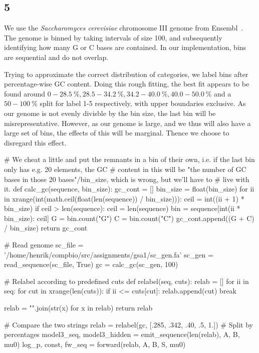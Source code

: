 \documentclass[10pt]{article}\usepackage[]{graphicx}\usepackage[]{color}
\theoremstyle{plain}
\begin{document}
\subsection*{5}
We use the \textit{Saccharomyces cerevisiae} chromosome III genome from Ensembl~\cite{sc}. The genome is binned by taking intervals of size 100, and subsequently identifying how many G or C bases are contained. In our implementation, bins are sequential and do not overlap. 

Trying to approximate the correct distribution of categories, we label bins after percentage-wise GC content. Doing this rough fitting, the best fit appears to be found around $0-28.5~\%, 28.5-34.2~\%, 34.2-40.0~\%, 40.0-50.0~\%$ and a $50-100~\%$ split for label 1-5 respectively, with upper boundaries exclusive. As our genome is not evenly divisble by the bin size, the last bin will be misrepresentative. However, as our genome is large, and we thus will also have a large set of bins, the effects of this will be marginal. Thence we choose to disregard this effect.


\begin{Schunk}
\begin{Sinput}
# We cheat a little and put the remnants in a bin of their own, i.e. if the last bin only has e.g. 20 elements, the GC
# content in this will be "the number of GC bases in those 20 bases"/bin_size, which is wrong, but we'll have to
# live with it.
def calc_gc(sequence, bin_size):
    gc_cont = []
    bin_size = float(bin_size)
    for ii in xrange(int(math.ceil(float(len(sequence)) / bin_size))):
        ceil = int((ii + 1) * bin_size)
        if ceil > len(sequence):
            ceil = len(sequence)
        bin = sequence[int(ii * bin_size): ceil]
        G = bin.count("G")
        C = bin.count("C")
        gc_cont.append((G + C) / bin_size)
    return gc_cont


# Read genome
sc_file = '/home/henrik/compbio/src/assignments/gsa1/sc_gen.fa'
sc_gen = read_sequence(sc_file, True)
gc = calc_gc(sc_gen, 100)


# Relabel according to predefined cuts
def relabel(seq, cuts):
    relab = []
    for ii in seq:
        for cut in xrange(len(cuts)):
            if ii <= cuts[cut]:
                relab.append(cut)
                break

    relab = "".join(str(x) for x in relab)
    return relab

# Compare the two strings
relab = relabel(gc, [.285, .342, .40, .5, 1.])  # Split by percentages
model3_seq, model3_hidden = emit_sequence(len(relab), A, B, mu0)
log_p, const, fw_seq = forward(relab, A, B, S, mu0)
\end{Sinput}
\end{Schunk}
\end{document}
